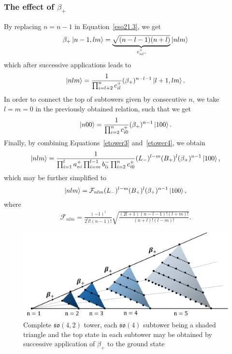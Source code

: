 \documentclass[12pt,a4paper]{report}
\theoremstyle{definition}
\theoremstyle{remark}
\theoremstyle{remark}
\begin{document}
\subsubsection{The effect of $\beta_+$}
By replacing $n=n-1$ in Equation~\ref{eso21.3}, we get
\begin{align*}
\beta_+\ket{n-1,lm}=\underbrace{\sqrt{(n-l-1)(n+l)}}_{c^+_{nl},}\ket{nlm}
\end{align*}
which after successive applications leads to
\begin{align*}
\ket{nlm}=\frac{1}{\prod_{i=l+2}^{n}c^+_{il}}(\beta_+)^{n-l-1}\ket{l+1,lm}.
\end{align*}
In order to connect the top of subtowers given by consecutive $n$, we take $l=m=0$ in the previously obtained relation, such that we get
\begin{equation}\label{etower4}
\ket{n00}=\frac{1}{\prod_{i=2}^{n}c^+_{i0}}(\beta_+)^{n-1}\ket{100}.
\end{equation}
Finally, by combining Equations~\ref{etower3} and~\ref{etower4}, we obtain
\begin{align*}
\ket{nlm}=\frac{1}{\prod_{i=1}^la^+_{ni}\prod_{i=m}^{l-1}b^-_{li}\prod_{i=2}^{n}c^+_{i0}}(L_-)^{l-m}(B_+)^l(\beta_+)^{n-1}\ket{100},
\end{align*}
which may be further simplified to
\begin{equation}\label{etower5}
\ket{nlm}=\mathcal{F}_{nlm}(L_-)^{l-m}(B_+)^l(\beta_+)^{n-1}\ket{100},
\end{equation}
where
\begin{align*}
\mathcal{F}_{nlm}=\frac{(-1)^l}{2^ll!(n-1)!}\sqrt{\frac{(2l+1)(n-l-1)!(l+m)!}{(n+l)!(l-m)!}}.
\end{align*}

\begin{figure}[!hbt]
\begin{center}
\includegraphics[width=\columnwidth]{tower_4.png}
\caption{Complete $\mathfrak{so}(4,2)$ tower, each $\mathfrak{so}(4)$ subtower being a shaded triangle and the top state in each subtower may be obtained by successive application of $\beta_+$ to the ground state}
\label{fig:tower_4}
\end{center}
\end{figure}
\end{document}
